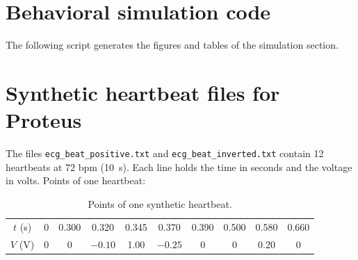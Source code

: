 \documentclass[11pt,letterpaper]{article}
\begin{document}
\appendix
\newpage
\section{Behavioral simulation code}\label{anx:codigo}
The following script generates the figures and tables of the simulation section.


\section{Synthetic heartbeat files for Proteus}
The files \texttt{ecg\_beat\_positive.txt} and \texttt{ecg\_beat\_inverted.txt} contain 12 heartbeats at 72 bpm (\SI{10}{s}). Each line holds the time in seconds and the voltage in volts. Points of one heartbeat:

\begin{table}[H]
\centering
\caption{Points of one synthetic heartbeat.}\label{tab:pwlin}
\begin{tabular}{@{}cccccccccc@{}}
\toprule
$t$ (s) & 0 & 0.300 & 0.320 & 0.345 & 0.370 & 0.390 & 0.500 & 0.580 & 0.660 \\
$V$ (V) & 0 & 0 & $-0.10$ & 1.00 & $-0.25$ & 0 & 0 & 0.20 & 0 \\
\bottomrule
\end{tabular}
\end{table}
\end{document}
